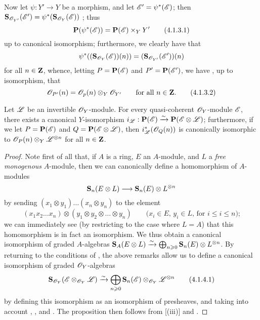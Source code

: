 \begin{env}[4.1.3]
\label{II.4.1.3}
Now let $\psi:Y'\to Y$ be a morphism, and let $\mathscr{E}'=\psi^*(\mathscr{E})$;
then $\mathbf{S}_{\mathscr{O}_{Y'}}(\mathscr{E}') = \psi^*(\mathbf{S}_{\mathscr{O}_Y}(\mathscr{E}))$ ;
thus 
\[
\label{II.4.1.3.1}
  \mathbf{P}(\psi^*(\mathscr{E})) = \mathbf{P}(\mathscr{E})\times_Y Y'
  \tag{4.1.3.1}
\]
up to canonical isomorphism;
furthermore, we clearly have that
\[
  \psi^*((\mathbf{S}_{\mathscr{O}_Y}(\mathscr{E}))(n)) = (\mathbf{S}_{\mathscr{O}_{Y'}}(\mathscr{E}'))(n)
\]
for all $n\in\mathbf{Z}$, whence, letting $P=\mathbf{P}(\mathscr{E})$ and $P'=\mathbf{P}(\mathscr{E}')$, we have , up to isomorphism, that
\[
\label{II.4.1.3.2}
  \mathscr{O}_{P'}(n) = \mathscr{O}_p(n)\otimes_Y\mathscr{O}_{Y'}
  \qquad\mbox{for all $n\in\mathbf{Z}$.}
  \tag{4.1.3.2}
\]
\end{env}

\begin{proposition}[4.1.4]
\label{II.4.1.4}
Let $\mathscr{L}$ be an invertible $\mathscr{O}_Y$-module.
For every quasi-coherent $\mathscr{O}_Y$-module $\mathscr{E}$, there exists a canonical $Y$-isomorphism $i_\mathscr{L}:\mathbf{P}(\mathscr{E})\xrightarrow{\sim}\mathbf{P}(\mathscr{E}\otimes\mathscr{L})$;
furthermore, if we let $P=\mathbf{P}(\mathscr{E})$ and $Q=\mathbf{P}(\mathscr{E}\otimes\mathscr{L})$, then $i_\mathscr{L}^*(\mathscr{O}_Q(n))$ is canonically isomorphic to $\mathscr{O}_P(n)\otimes_Y\mathscr{L}^{\otimes n}$ for all $n\in\mathbf{Z}$.
\end{proposition}

\begin{proof}
Note first of all that, if $A$ is a ring, $E$ an $A$-module, and $L$ a \emph{free monogenous} $A$-module, then we can canonically define a homomorphism of $A$-modules
\[
  \bb{S}_n(E\otimes L) \to \bb{S}_n(E)\otimes L^{\otimes n}
\]
by sending $(x_1\otimes y_1)\ldots(x_n\otimes y_n)$ to the element
\[
  (x_1x_2\ldots x_n)\otimes(y_1\otimes y_2\otimes\ldots\otimes y_n)
  \qquad\mbox{($x_i\in E$, $y_i\in L$, for $i\leq i\leq n$);}
\]
we can immediately see (by restricting to the case where $L=A$) that this homomorphism is in fact an isomorphism.
We thus obtain a canonical isomorphism of graded $A$-algebras $\mathbf{S}_A(E\otimes L)\xrightarrow{\sim}\bigoplus_{n\geqslant0}\mathbf{S}_n(E)\otimes L^{\otimes n}$.
By returning to the conditions of , the above remarks allow us to define a canonical isomorphism of graded $\mathscr{O}_Y$-algebras
\[
\label{II.4.1.4.1}
  \mathbf{S}_{\mathscr{O}_Y}(\mathscr{E}\otimes_{\mathscr{O}_Y}\mathscr{L}) \xrightarrow{\sim} \bigoplus_{n\geqslant0}\mathbf{S}_n(\mathscr{E})\otimes_{\mathscr{O}_Y}\mathscr{L}^{\otimes n}
  \tag{4.1.4.1}
\]
by defining this isomorphism as an isomorphism of presheaves, and taking into account , , and .
The proposition then follows from [(iii)] and .
\end{proof}

